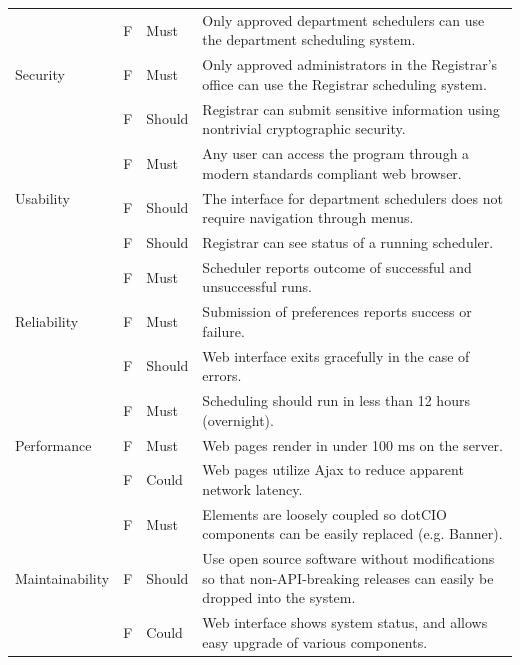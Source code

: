 \documentclass[11pt]{article}
\newcounter{id}
\newcommand{\specid}{\arabic{id}\stepcounter{id}}
\begin{document}
\begin{longtable}{|m{1in}|m{0.3in}|m{0.6in}|m{4.5in}|}
\multirow{3}{*}{Security }
 & F\specid & Must
 & Only approved department schedulers can use the department scheduling system. \\  \cline{2-4}
 &F\specid & Must
 & Only approved administrators in the Registrar's office can use the Registrar scheduling system. \\  \cline{2-4}
 &F\specid & Should
 & Registrar can submit sensitive information using nontrivial cryptographic security. \\  \hline\hline


\multirow{3}{*}{Usability }
 & F\specid & Must
 & Any user can access the program through a modern standards compliant web browser. \\  \cline{2-4}
 &F\specid & Should
 & The interface for department schedulers does not require navigation through menus. \\  \cline{2-4}
 & F\specid & Should
 & Registrar can see status of a running scheduler. \\ \hline\hline

\multirow{3}{*}{Reliability }

 &F\specid & Must
 & Scheduler reports outcome of successful and unsuccessful runs. \\  \cline{2-4}
 & F\specid & Must
 & Submission of preferences reports success or failure. \\\cline{2-4}
 & F\specid & Should
 & Web interface exits gracefully in the case of errors. \\   \hline \hline

\multirow{3}{*}{Performance }
 & F\specid & Must
 & Scheduling should run in less than 12 hours (overnight). \\  \cline{2-4}
 &F\specid & Must
 & Web pages render in under 100 ms on the server. \\  \cline{2-4}
 & F\specid & Could
 & Web pages utilize Ajax to reduce apparent network latency. \\ \hline\hline

\multirow{3}{*}{Maintainability}
 & F\specid & Must
 &  Elements are loosely coupled so dotCIO components can be easily replaced (e.g. Banner).\\  \cline{2-4}
 &F\specid & Should
 & Use open source software without modifications so that non-API-breaking releases can easily be dropped into the system. \\  \cline{2-4}
 & F\specid & Could
 & Web interface shows system status, and allows easy upgrade of various components. \\ \hline


\end{longtable}
\end{document}
